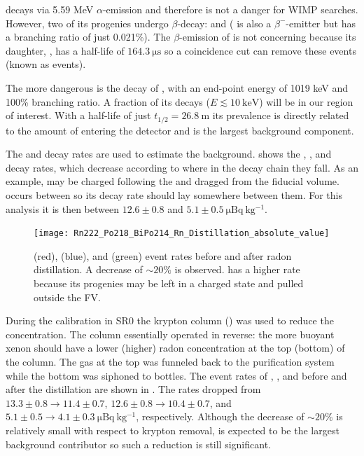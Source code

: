  decays via 5.59 MeV $\alpha$-emission and therefore is not a danger for WIMP searches.  However, two of its progenies
undergo $\beta$-decay:  and  ( is also a $\beta^-$-emitter but has a branching ratio of just
0.021\%).  The $\beta$-emission of  is not concerning because its daughter, , has a half-life of
$164.3\ \mathrm{\mu s}$ so a coincidence cut can remove these events (known as  events).

The more dangerous is the decay of , with an end-point energy of 1019 keV and 100\% branching ratio.  A fraction of
its decays ($E \lesssim 10\ \mathrm{keV}$) will be in our region of interest.  With a half-life of just $t_{1/2} = 26.8\ \mathrm{m}$ its
prevalence is directly related to the amount of  entering the detector and is the largest background component.

The  and  decay rates are used to estimate the 
background.   shows the , , and  decay
rates, which decrease according to where in the decay chain they fall.  As an example,  may be charged following the
 \alphadecay and dragged from the fiducial volume.   occurs between   so
its decay rate should lay somewhere between them.  For this analysis it is then between $12.6 \pm 0.8$ and
$5.1 \pm 0.5\ \mathrm{\mu Bq\ kg^{-1}}$.

\begin{figure}
\centering
\texttt{[image: Rn222\_Po218\_BiPo214\_Rn\_Distillation\_absolute\_value]}
\caption{ (red),  (blue), and  (green) event rates before and after radon
distillation.  A decrease of ${\sim} 20\%$ is observed.   has a higher rate because its progenies may be left in a charged
state and pulled outside the FV.}
\label{fig:backgrounds_electronic_radon_distillation}
\end{figure}

During the  calibration in SR0 the krypton column () was used to reduce the 
concentration.  The column essentially operated in reverse: the more buoyant xenon should have a lower (higher) radon concentration at the
top (bottom) of the column.  The gas at the top was funneled back to the purification system while the bottom was siphoned to
bottles.  The event rates of , , and  before and after the distillation are shown
in .  The rates dropped from $13.3 \pm 0.8 \rightarrow 11.4 \pm 0.7$,
$12.6 \pm 0.8 \rightarrow 10.4 \pm 0.7$, and $5.1 \pm 0.5 \rightarrow 4.1 \pm 0.3\ \mathrm{\mu Bq\ kg^{-1}}$, respectively.  Although the
decrease of ${\sim}20\%$ is relatively small with respect to krypton removal,  is expected to be the largest background
contributor so such a reduction is still significant.


